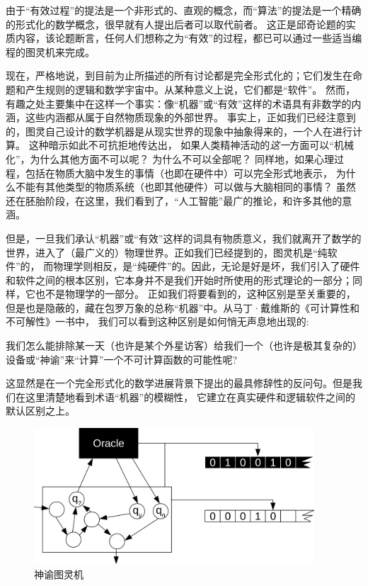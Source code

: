 \documentclass[a4paper,12pt]{article}
\begin{document}
由于“有效过程”的提法是一个非形式的、直观的概念，而“算法”的提法是一个精确的形式化的数学概念，很早就有人提出后者可以取代前者。
这正是\gls{邱奇论题}的实质内容\cite{KleeneSC1952}，该论题断言，任何人们想称之为“有效”的过程，都已可以通过一些适当编程的图灵机来完成。

现在，严格地说，到目前为止所描述的所有讨论都是完全形式化的；它们发生在命题和产生规则的逻辑和数学宇宙中。从某种意义上说，它们都是“软件”。
然而，有趣之处主要集中在这样一个事实：像“机器”或“有效”这样的术语具有非数学的内涵，这些内涵都从属于自然物质现象的外部世界。
事实上，正如我们已经注意到的，图灵自己设计的数学机器是从现实世界的现象中抽象得来的，一个人在进行计算。
这种暗示如此不可抗拒地传达出， 如果人类精神活动的\emph{这一}方面可以“机械化”，为什么其他方面不可以呢？ 为什么不可以全部呢？
同样地，如果心理过程，包括在物质大脑中发生的事情（也即在硬件中）可以完全形式地表示，
为什么不能有其他类型的物质系统（也即其他硬件）可以做与大脑相同的事情？
虽然还在胚胎阶段，在这里，我们看到了，“人工智能”最广的推论，和许多其他的意涵。

但是，一旦我们承认“机器”或“有效”这样的词具有物质意义，我们就离开了数学的世界，进入了（最广义的）物理世界。正如我们已经提到的，图灵机是“纯软件”的，
而物理学则相反，是“纯硬件”的。因此，无论是好是坏，我们引入了硬件和软件之间的根本区别，它本身并不是我们开始时所使用的形式理论的一部分；同样，它也不是物理学的一部分。
正如我们将要看到的，这种区别是至关重要的，但是也是隐蔽的，藏在包罗万象的总称“机器”中。从马丁·戴维斯的《可计算性和不可解性》\cite{DavisM1958}一书中，
我们可以看到这种区别是如何悄无声息地出现的:

\begin{displayquote}
    我们怎么能排除某一天（也许是某个外星访客）给我们一个（也许是极其复杂的）设备或“神谕”来“计算”一个不可计算函数的可能性呢?
\end{displayquote}

这显然是在一个完全形式化的数学进展背景下提出的最具修辞性的反问句。但是我们在这里清楚地看到术语“机器”的模糊性，
它建立在真实硬件和逻辑软件之间的默认区别之上。

\begin{figure}[ht]
\centering
\includegraphics[height=2.0in]{images/turing_machine_oracle.png}
\caption{\gls{神谕图灵机}}
\end{figure}
\end{document}
